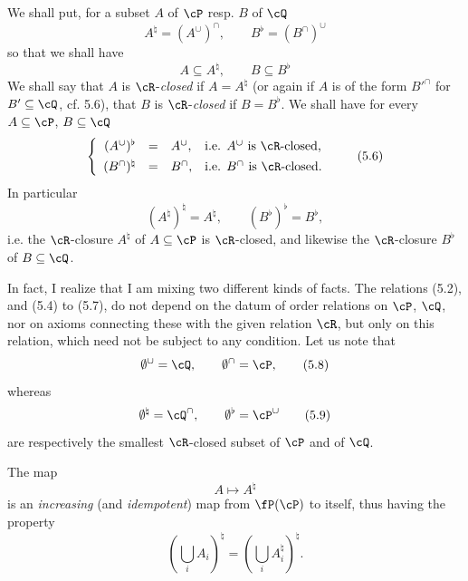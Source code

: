 
We shall put, for a subset $A$ of $\cP$ resp. $B$ of $\cQ$
\[
A^{\natural} = (A^{\cup})^{\cap}, \qquad B^{\flat} = (B^{\cap})^{\cup}
\tag*{(5.4)}
\]
so that we shall have
\[
A \subseteq A^{\natural}, \qquad B \subseteq B^{\flat}
\tag*{(5.5)}
\]
We shall say that $A$ is $\cR$-\textit{closed} if $A = A^{\natural}$ (or again if $A$ is of the form $B'^{\cap}$ for $B' \subseteq \cQ$, cf. 5.6), that
$B$ is $\cR$-\textit{closed} if $B = B^{\flat}$. We shall have for every $A \subseteq \cP$, $B \subseteq \cQ$
\[
\left\{
\begin{array}{rcll}
(A^{\cup})^{\flat} & = & A^{\cup}, & \text{i.e. } A^{\cup} \text{ is } \cR\text{-closed,}\\[1ex]
(B^{\cap})^{\natural} & = & B^{\cap}, & \text{i.e. } B^{\cap} \text{ is } \cR\text{-closed.}
\end{array}
\right.
\tag*{(5.6)}
\]
In particular
\[
(A^{\natural})^{\natural} = A^{\natural}, \qquad (B^{\flat})^{\flat} = B^{\flat},
\tag*{(5.7)}
\]
i.e. the $\cR$-closure $A^{\natural}$ of $A \subseteq \cP$ is $\cR$-closed, and likewise the $\cR$-closure $B^{\flat}$ of $B \subseteq \cQ$. %

In fact, I realize that I am mixing two different kinds of facts. The relations (5.2), and (5.4) to (5.7), do not depend on the datum of order relations on $\cP$, $\cQ$, nor on axioms connecting these with the given relation $\cR$, but only on this relation, which need not be subject to any condition. Let us note that %
\[
\emptyset^{\cup} = \cQ, \qquad \emptyset^{\cap} = \cP,
\tag*{(5.8)}
\]
whereas
\[
\emptyset^{\natural} = \cQ^{\cap}, \qquad \emptyset^{\flat} = \cP^{\cup}
\tag*{(5.9)}
\]
are respectively the smallest $\cR$-closed subset of $\cP$ and of $\cQ$.

The map
\[
A \longmapsto A^{\natural}
\tag*{(5.10)}
\]
is an \textit{increasing} (and \textit{idempotent}) map from $\fP(\cP)$ to itself, thus having the property
\[
(\bigcup_i A_i)^{\natural} = (\bigcup_i A_i^{\natural})^{\natural}.
\]


